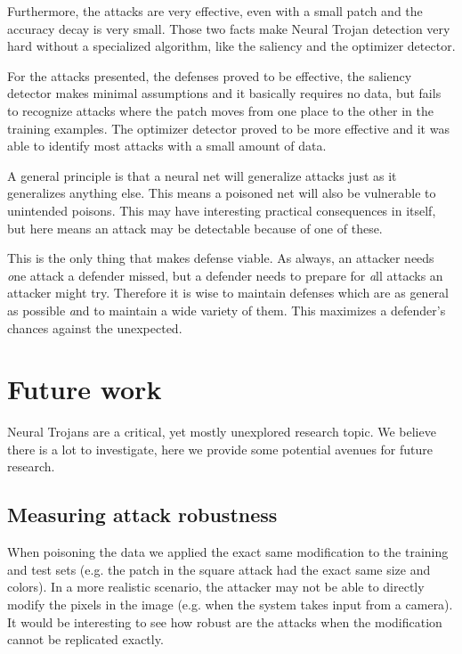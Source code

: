 \documentclass[letterpaper, 10 pt, conference]{ieeeconf}  %
\begin{document}
Furthermore, the attacks are very effective, even with a small patch and the
accuracy decay is very small. Those two facts make Neural Trojan detection
very hard without a specialized algorithm, like the saliency and the
optimizer detector.

For the attacks presented, the defenses proved to be effective, the saliency
detector makes minimal assumptions and it basically requires no data, but fails
to recognize attacks where the patch moves from one place to the other in the
training examples. The optimizer detector proved to be more effective and it
was able to identify most attacks with a small amount of data.

A general principle is that a neural net will generalize attacks just
as it generalizes anything else.  This means a poisoned net will also
be vulnerable to unintended poisons.  This may have interesting
practical consequences in itself, but here means an attack may be
detectable because of one of these.

This is the only thing that makes defense viable.  As always, an
attacker needs {\textit one} attack a defender missed, but a defender
needs to prepare for {\textit all} attacks an attacker might try.
Therefore it is wise to maintain defenses which are as general as
possible {\textit and} to maintain a wide variety of them.  This
maximizes a defender's chances against the unexpected.

\section{Future work}

Neural Trojans are a critical, yet mostly unexplored research topic. We believe
there is a lot to investigate, here we provide some potential avenues for
future research.

\subsection{Measuring attack robustness}

When poisoning the data we applied the exact same modification to the training
and test sets (e.g. the patch in the square attack had the exact same size and
colors). In a more realistic scenario, the attacker may not be able to directly
modify the pixels in the image (e.g. when the system takes input from a
camera). It would be interesting to see how robust are the attacks when the
modification cannot be replicated exactly.
\end{document}
